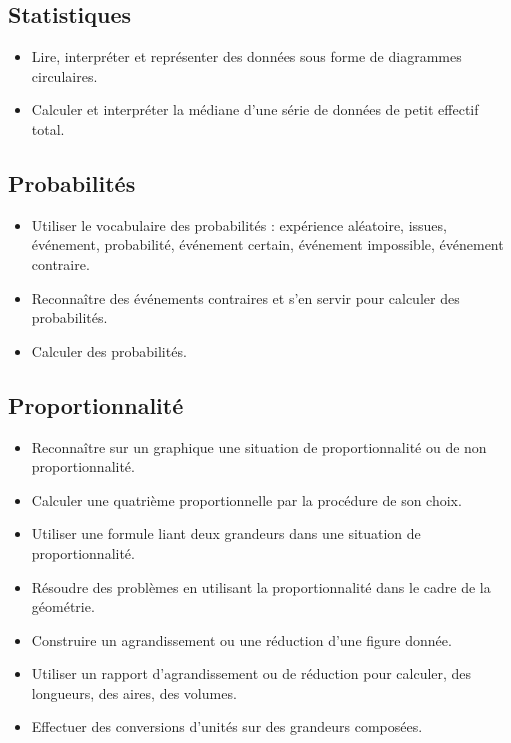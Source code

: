 \documentclass[a4paper,12pt,fleqn]{article}	
\begin{document}
\renewcommand{\labelitemi}{}

\subsection*{Statistiques}

\begin{itemize}
	\item {}Lire, interpréter et représenter des données sous forme de diagrammes circulaires.
	\item {}Calculer et interpréter la médiane d’une série de données de petit effectif total.
\end{itemize}

\subsection*{Probabilités}

\begin{itemize}
	\item {}Utiliser le vocabulaire des probabilités : expérience aléatoire, issues, événement, probabilité, événement certain, événement impossible, événement contraire.%
	\item {}Reconnaître des événements contraires et s’en servir pour calculer des probabilités. %
	\item {}Calculer des probabilités. %
\end{itemize}

\subsection*{Proportionnalité}

\begin{itemize}
	\item {}Reconnaître sur un graphique une situation de proportionnalité ou de non proportionnalité.
	\item {}Calculer une quatrième proportionnelle par la procédure de son choix.
	\item {}Utiliser une formule liant deux grandeurs dans une situation de proportionnalité.
	\item {}Résoudre des problèmes en utilisant la proportionnalité dans le cadre de la géométrie.
	\item {}Construire un agrandissement ou une réduction d’une figure donnée.
	\item {}Utiliser un rapport d’agrandissement ou de réduction pour calculer, des longueurs, des aires, des volumes.
	\item {}Effectuer des conversions d’unités sur des grandeurs composées.
\end{itemize}
\end{document}
